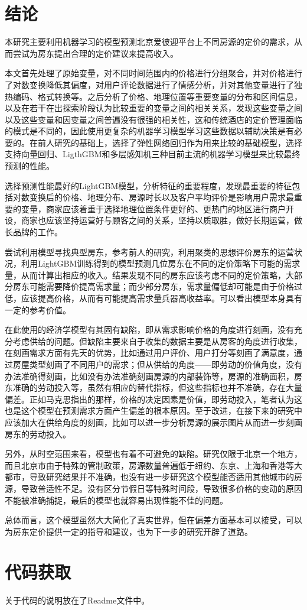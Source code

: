 \documentclass{article}
\begin{document}
\begin{multicols}{2}
\section{结论}
本研究主要利用机器学习的模型预测北京爱彼迎平台上不同房源的定价的需求，从而尝试为房东提出合理的定价建议来提高收入。
\par 本文首先处理了原始变量，对不同时间范围内的价格进行分组聚合，并对价格进行了对数变换降低其偏度，对用户评论数据进行了情感分析，并对其他变量进行了独热编码、格式转换等。之后分析了价格、地理位置等重要变量的分布和区间信息，以及在若干在出探索阶段认为比较重要的变量之间的相关关系，发现这些变量之间以及这些变量和因变量之间普遍没有很强的相关性，这和传统酒店的定价管理面临的模式是不同的，因此使用更复杂的机器学习模型学习这些数据以辅助决策是有必要的。在前人研究的基础上，选择了弹性网络回归作为用来比较的基础模型，选择支持向量回归、LigthGBM和多层感知机三种目前主流的机器学习模型来比较最终预测的性能。
\par 选择预测性能最好的LightGBM模型，分析特征的重要程度，发现最重要的特征包括对数变换后的价格、地理分布、房源时长以及客户平均评价是影响用户需求最重要的变量，商家应该着重于选择地理位置条件更好的、更热门的地区进行商户开设，商家也应该坚持运营好与顾客之间的关系，坚持以质取胜，做好长期运营，做长品牌的工作。
\par 尝试利用模型寻找典型房东，参考前人的研究，利用聚类的思想评价房东的运营状况，利用LightGBM训练得到的模型预测几位房东在不同的定价策略下可能的需求量，从而计算出相应的收入。结果发现不同的房东应该考虑不同的定价策略，大部分房东可能需要降价提高需求量；而少部分房东，需求量偏低却可能是由于价格过低，应该提高价格，从而有可能提高需求量兵器高收益率。可以看出模型本身具有一定的参考价值。
\par 在此使用的经济学模型有其固有缺陷，即从需求影响价格的角度进行刻画，没有充分考虑供给的问题。但缺陷主要来自于收集的数据主要是从房客的角度进行收集，在刻画需求方面有先天的优势，比如通过用户评价、用户打分等刻画了满意度，通过房屋类型刻画了不同用户的需求；但从供给的角度——即劳动的价值角度，没有办法准确得刻画，比如没有办法准确刻画房源的内部装饰等，房源的准确面积，房东准确的劳动投入等，虽然有相应的替代指标，但这些指标也并不准确，存在大量偏差。正如马克思指出的那样，价格的决定因素是价值，即劳动投入，笔者认为这也是这个模型在预测需求方面产生偏差的根本原因。至于改进，在接下来的研究中应该加大在供给角度的刻画，比如可以进一步分析房源的展示图片从而进一步刻画房东的劳动投入。
\par 另外，从时空范围来看，模型也有着不可避免的缺陷。研究仅限于北京一个地方，而且北京市由于特殊的管制政策，房源数量普遍低于纽约、东京、上海和香港等大都市，导致研究结果并不准确，也没有进一步研究这个模型能否适用其他城市的房源，导致普适性不足。没有区分节假日等特殊时间段，导致很多价格的变动的原因不能被准确捕捉，最后的模型也就容易出现性能不佳的问题。
\par 总体而言，这个模型虽然大大简化了真实世界，但在偏差方面基本可以接受，可以为房东定价提供一定的指导和建议，也为下一步的研究开辟了道路。
\section{代码获取}
关于代码的说明放在了Readme文件中。

\end{multicols}
\newpage


\end{document}
